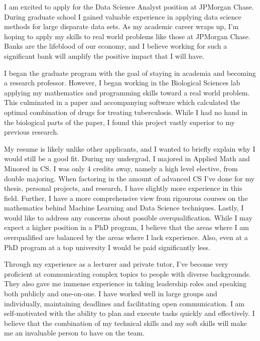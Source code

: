 
I am excited to apply for the Data Science Analyst position at JPMorgan Chase.
During graduate school I gained valuable experience in applying data science methods for large disparate data sets.
As my academic career wraps up, I'm hoping to apply my skills to real world problems like those at JPMorgan Chase.
Banks are the lifeblood of our economy, and I believe working for such a significant bank will amplify the positive impact that I will have.


I began the graduate program with the goal of staying in academia and becoming a research professor.
However, I began working in the Biological Sciences lab applying my mathematics and programming skills toward a real world problem.
This culminated in a paper and accompanying software which calculated the optimal combination of drugs for treating tuberculosis.
While I had no hand in the biological parts of the paper, I found this project vastly superior to my previous research.


My resume is likely unlike other applicants, and I wanted to briefly explain why I would still be a good fit.
During my undergrad, I majored in Applied Math and Minored in CS.
I was only 4 credits away, namely a high level elective, from double majoring.
When factoring in the amount of advanced CS I've done for my thesis, personal projects, and research, I have slightly more experience in this field.
Further, I have a more comprehensive view from rigourous courses on the mathematics behind Machine Learning and Data Science techniques.
Lastly, I would like to address any concerns about possible overqualification.
While I may expect a higher position in a PhD program, I believe that the areas where I am overqualified are balanced by the areas where I lack experience.
Also, even at a PhD program at a top university I would be paid significantly less.


Through my experience as a lecturer and private tutor, I've become very proficient at communicating complex topics to people with diverse backgrounds.
They also gave me immense experience in taking leadership roles and speaking both publicly and one-on-one.
I have worked well in large groups and individually, maintaining deadlines and facilitating open communication.
I am self-motivated with the ability to plan and execute tasks quickly and effectively.
I believe that the combination of my technical skills and my soft skills will make me an invaluable person to have on the team.
